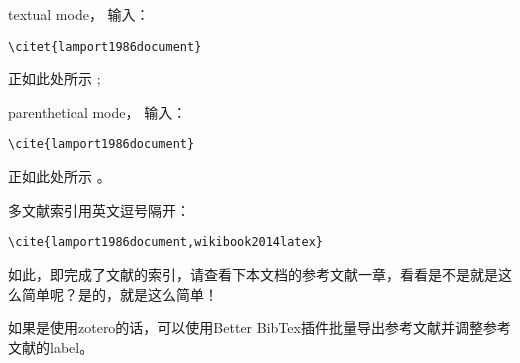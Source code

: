 	textual mode， 输入：
	
	\verb|\citet{lamport1986document}|
	
	正如此处所示 \cite{lamport1986document}; 
	
	parenthetical mode， 输入：
	
	\verb|\cite{lamport1986document}|
	
	正如此处所示 \cite{lamport1986document}。
	
	多文献索引用英文逗号隔开：
	
	\verb|\cite{lamport1986document,wikibook2014latex}|
	
	如此，即完成了文献的索引，请查看下本文档的参考文献一章，看看是不是就是这么简单呢？是的，就是这么简单\cite{wikibook2014latex}！
	
	如果是使用zotero的话，可以使用Better BibTex插件批量导出参考文献并调整参考文献的label。

	
